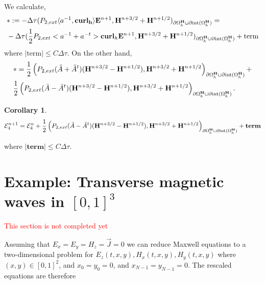 \documentclass[12pt,reqno]{amsart}
\newcommand{\curl}{{\bf curl}}
\newcommand{\acurl}{\langle a^{-1},{\bf curl_h}\rangle}
\newcommand{\e}{{\bf E}}
\newcommand{\h}{{\bf H}}
\newtheorem{cor}[theorem]{Corollary}
\newtheorem{lem}[theorem]{Lemma}
\theoremstyle{definition}
\numberwithin{equation}{section}
\newcommand{\intr}[1]{\mathrm{int}(#1)}
\def\Gwh{\Omega_h}
\begin{document}
We calculate,
\begin{align*}
&
*:=	-\Delta \tau( P_{2,ext}\acurl\e^{n+1},\h^{n+3/2}+\h^{n+1/2})_{\partial{\Gwh^\h}\cup \partial \intr{\Gwh^\h}}=\\&
		-\Delta \tau( \frac{1}{2}P_{2,ext}<a^{-1}+a^{-t}>\curl_h\e^{n+1},\h^{n+3/2}+\h^{n+1/2})_{\partial{\Gwh^\h}\cup \partial \intr{\Gwh^\h}}+\mathrm{term}
\end{align*}
where $|\mathrm{term}|\leq C\Delta \tau$.
On the other hand,
\begin{align*}
	&
*=\frac{1}{2}\left( P_{2,ext}(\tilde{A}+\tilde{A}^{t})(\h^{n+3/2}-\h^{n+1/2}),
\h^{n+3/2}+\h^{n+1/2}\right)_{\partial{\Gwh^\h}\cup \partial \intr{\Gwh^\h}}+\\&
\frac{1}{2}\left( P_{2,ext}(\tilde{A}-\tilde{A}^{t})(\h^{n+3/2}-\h^{n+1/2}),
\h^{n+3/2}+\h^{n+1/2}\right)_{\partial{\Gwh^\h}\cup \partial \intr{\Gwh^\h}}.
\end{align*}
\begin{cor}
\begin{align*}
\mathcal{E}_4^{n+1}=\mathcal{E}_4^{n}+
\frac{1}{2}\left( P_{2,ext}(\tilde{A}-\tilde{A}^{t})(\h^{n+3/2}-\h^{n+1/2}),
\h^{n+3/2}+\h^{n+1/2}\right)_{\partial{\Gwh^\h}\cup \partial \intr{\Gwh^\h}}+\mathbf{term}
\end{align*}
\end{cor}
where $|\mathbf{term}|\leq C\Delta \tau$.









 

	

	\newpage
	\section{Example: Transverse magnetic waves  in $[0,1]^3$}\label{sec:TE}
	\textcolor{red}{This section is not completed yet}
	
	Assuming that $E_x=E_y=H_z=\vec{J}=0$ we can reduce Maxwell equations to a two-dimensional problem for $E_z(t,x,y), H_x(t,x,y), H_y(t,x,y)$ where  $(x,y)\in[0,1]^2$, and
	$x_0=y_0=0$, and $x_{N-1}=y_{N-1}=0$.
	The rescaled equations are therefore 
	
\end{document}
